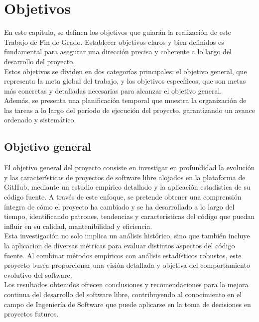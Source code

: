 \documentclass[a4paper, 12pt]{book}
\begin{document}

\cleardoublepage %
\chapter{Objetivos} %
\label{chap:objetivos} %

En este capítulo, se definen los objetivos que guiarán la realización de este Trabajo de Fin de Grado.
Establecer objetivos claros y bien definidos es fundamental para asegurar una dirección precisa y coherente
a lo largo del desarrollo del proyecto.
\\Estos objetivos se dividen en dos categorías principales: el objetivo general,
que representa la meta global del trabajo, y los objetivos específicos, que son metas más concretas y detalladas necesarias
para alcanzar el objetivo general. 
\\Además, se presenta una planificación temporal que muestra la organización de las tareas a lo largo
del período de ejecución del proyecto, garantizando un avance ordenado y sistemático.

\section{Objetivo general} %
\label{sec:objetivo-general} %

El objetivo general del proyecto consiste en investigar en profundidad la evolución y las características de proyectos de software libre
alojados en la plataforma de GitHub, mediante un estudio empírico detallado y la aplicación estadística de su código fuente. 
A través de este enfoque, se pretende obtener una comprensión íntegra de cómo el proyecto ha cambiado y se ha desarrollado a lo
largo del tiempo, identificando patrones, tendencias y características del código que puedan influir en su calidad, mantenibilidad y eficiencia.
\\Esta investigación no solo implica un análisis histórico, sino que también incluye la aplicacion de diversas métricas
para evaluar distintos aspectos del código fuente. 
Al combinar métodos empíricos con análisis estadísticos robustos, este proyecto busca proporcionar una visión detallada y objetiva
del comportamiento evolutivo del software.
\\Los resultados obtenidos ofrecen conclusiones y recomendaciones para la mejora continua del desarrollo del software libre,
contribuyendo al conocimiento en el campo de Ingeniería de Software que puede aplicarse en la toma de decisiones en proyectos futuros.
\end{document}

